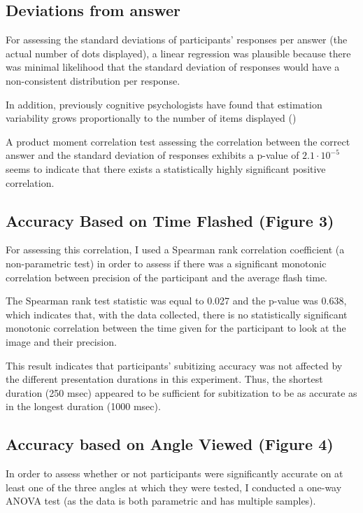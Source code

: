 \documentclass[12pt]{article}
\begin{document}
\subsection{Deviations from answer}

For assessing the standard deviations of participants' responses per answer
(the actual number of dots displayed), a linear regression was plausible
because there was minimal likelihood that the standard deviation of responses
would have a non-consistent distribution per response.

In addition, previously cognitive psychologists have found that estimation
variability grows proportionally to the number of items displayed (\cite{prop})

A product moment correlation test assessing the correlation between the correct
answer and the standard deviation of responses exhibits a p-value of $2.1 \cdot
10^{-5}$ seems to indicate that there exists a statistically highly significant
positive correlation.

\subsection{Accuracy Based on Time Flashed (Figure 3)}

For assessing this correlation, I used a Spearman rank correlation coefficient
(a non-parametric test) in order to assess if there was a significant monotonic
correlation between precision of the participant and the average flash time.

The Spearman rank test statistic was equal to 0.027 and the p-value was 0.638,
which indicates that, with the data collected, there is no statistically
significant monotonic correlation between the time given for the
participant to look at the image and their precision.

This result indicates that participants’ subitizing accuracy was not affected
by the different presentation durations in this experiment. Thus, the shortest
duration (250 msec) appeared to be sufficient for subitization to be as
accurate as in the longest duration (1000 msec).

\subsection{Accuracy based on Angle Viewed (Figure 4)}

In order to assess whether or not participants were significantly accurate on
at least one of the three angles at which they were tested, I conducted
a one-way ANOVA test (as the data is both parametric and has multiple samples).
\end{document}
